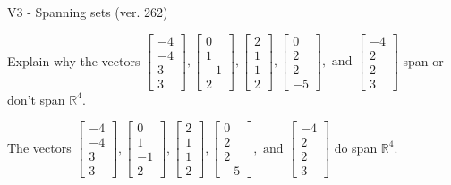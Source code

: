 \begin{exercise}
  \begin{exerciseTitle}V3 - Spanning sets (ver. 262)\end{exerciseTitle}
  \begin{exerciseStatement}
    Explain why the vectors \(\left[\begin{array}{r}
-4 \\
-4 \\
3 \\
3
\end{array}\right] , \left[\begin{array}{r}
0 \\
1 \\
-1 \\
2
\end{array}\right] , \left[\begin{array}{r}
2 \\
1 \\
1 \\
2
\end{array}\right] , \left[\begin{array}{r}
0 \\
2 \\
2 \\
-5
\end{array}\right] , \text{ and } \left[\begin{array}{r}
-4 \\
2 \\
2 \\
3
\end{array}\right]\) span or don't span \(\mathbb{R}^4\). 
	


  \end{exerciseStatement}
  \begin{exerciseAnswer}
   The vectors \(\left[\begin{array}{r}
-4 \\
-4 \\
3 \\
3
\end{array}\right] , \left[\begin{array}{r}
0 \\
1 \\
-1 \\
2
\end{array}\right] , \left[\begin{array}{r}
2 \\
1 \\
1 \\
2
\end{array}\right] , \left[\begin{array}{r}
0 \\
2 \\
2 \\
-5
\end{array}\right] , \text{ and } \left[\begin{array}{r}
-4 \\
2 \\
2 \\
3
\end{array}\right]\) 
  	 do  
	span \(\mathbb{R}^4\).
  


  \end{exerciseAnswer}
\end{exercise}